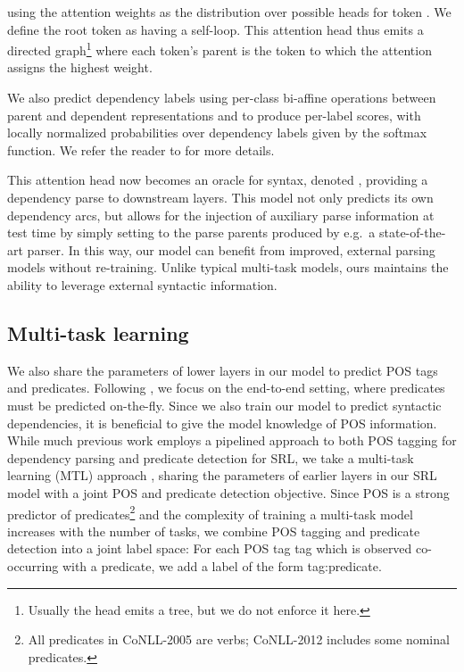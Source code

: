 \documentclass[11pt,a4paper]{article}
\begin{document}
using the attention weights  as the distribution over possible heads for token . We define the root token as having a self-loop. This attention head thus emits a directed graph\footnote{Usually the head emits a tree, but we do not enforce it here.} where each token's parent is the token to which the attention  assigns the highest weight. 

We also predict dependency labels using per-class bi-affine operations between parent and dependent representations  and  to produce per-label scores, with locally normalized probabilities over dependency labels  given by the softmax function. We refer the reader to \citet{dozat2017deep} for more details.

This attention head now becomes an oracle for syntax, denoted , providing a dependency parse to downstream layers. This model not only predicts its own dependency arcs, but allows for the injection of auxiliary parse information at test time by simply setting  to the parse parents produced by e.g.\ a state-of-the-art parser. In this way, our model can benefit from improved, external parsing models without re-training.
Unlike typical multi-task models, ours maintains the ability to leverage external syntactic information.





\subsection{Multi-task learning \label{sec:MTL}}
We also share the parameters of lower layers in our model to predict POS tags and predicates. Following \citet{he2017deep}, we focus on the end-to-end setting, where predicates must be predicted on-the-fly. Since we also train our model to predict syntactic dependencies, it is beneficial to give the model knowledge of POS information. While much previous work employs a pipelined approach to both POS tagging for dependency parsing and predicate detection for SRL, we take a multi-task learning (MTL) approach \citep{caruana1993multitask}, sharing the parameters of earlier layers in our SRL model with a joint POS and predicate detection objective. Since POS is a strong predictor of predicates\footnote{All predicates in CoNLL-2005 are verbs; CoNLL-2012 includes some nominal predicates.} 
and the complexity of training a multi-task model increases with the number of tasks, we combine POS tagging and predicate detection into a joint label space: For each POS tag {\sc tag} which is observed co-occurring with a predicate, we add a label of the form {\sc tag:predicate}.
\end{document}
